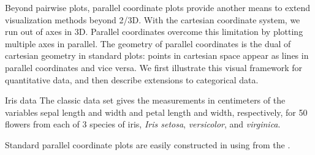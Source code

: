 \documentclass[11pt]{book}
\renewenvironment{knitrout}{\small\renewcommand{\baselinestretch}{.85}}{} %
\begin{document}
Beyond pairwise plots, parallel coordinate plots 
\citep{Inselberg:1985,Inselberg:1989,Wegman:1990}
provide another means to
extend visualization methods beyond 2/3D. With the cartesian coordinate
system, we run out of axes in 3D.  Parallel coordinates overcome this
limitation by plotting multiple axes in parallel.
The geometry of parallel coordinates is the dual of cartesian
geometry in standard plots: points in cartesian space appear as lines
in parallel coordinates and vice versa.
We first illustrate this visual framework for quantitative data, and
then describe extensions to categorical data.

\begin{Example}[iris1]{Iris data}
The classic  data set \citep{Anderson:35,Fisher:36}
gives the measurements in centimeters of the variables sepal length and width and petal length and width, respectively, for 50 flowers from each of 3 species of iris, \emph{Iris setosa}, \emph{versicolor}, and \emph{virginica}. 

Standard parallel coordinate plots are easily constructed in \R using
 from the .
\begin{knitrout}
\color{fgcolor}\begin{kframe}
\begin{alltt}
\hlstd{(}\hlstd{,} \hlstd{=}\hlstd{)}
 \hlkwb{<-} \hlstd{(}\hlstd{,} \hlstd{,} 
 \hlkwb{=} \hlstd{(}
          \hlstd{=} \hlstd{,}
          \hlstd{=} \hlstd{(}\hlstd{=}\hlstd{(}\hlstd{,} \hlstd{,} \hlstd{),} \hlstd{=}\hlstd{),}
         \hlstd{=}\hlstd{(}\hlstd{,} \hlstd{,} \hlstd{),}
          \hlstd{=} \hlstd{(}\hlstd{(}\hlstd{,} \hlstd{,} \hlstd{)))}

\hlstd{(}\hlopt{~}\hlstd{iris[}\hlopt{:}\hlstd{], iris,}  
   \hlstd{= vnames[}\hlopt{:}\hlstd{],} 
   \hlstd{=} \hlstd{,} \hlstd{=}\hlstd{,}
  \hlstd{=}\hlstd{(}\hlstd{,} \hlstd{,} \hlstd{))}
\end{alltt}
\end{kframe}\begin{figure}[!htbp]



\end{figure}
\end{knitrout}
\end{Example}
\end{document}

